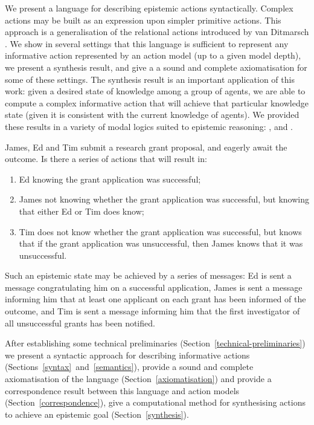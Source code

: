 \documentclass[twoside]{aiml14}
\begin{document}
  We present a language for describing epistemic actions syntactically.
  Complex actions may be built as an expression upon simpler primitive actions.
  This approach is a generalisation of the relational actions introduced by van
  Ditmarsch \cite{vanditmarsch2001}. We show in several settings that this
  language is sufficient to represent any informative action represented by an
  action model (up to a given model depth), we present a synthesis result,
  and give a a sound and complete axiomatisation for some of these settings. 
  The synthesis result is an important application of this work: given a
  desired state of knowledge among a group of agents, we are able to compute a
  complex informative action that will achieve that particular knowledge state
  (given it is consistent with the current knowledge of agents). We provided
  these results in a variety of modal logics suited to epistemic reasoning:
  \classK{}, \classKFF{} and \classS{}.
  
  \begin{example}\label{grant-example}
  James, Ed and Tim submit a research grant proposal, and eagerly await the
  outcome. Is there a series of actions that will result in: 

  \begin{enumerate}
    \item Ed knowing the grant application was successful; 
    \item James not knowing whether the grant application was successful, but knowing that
        either Ed or Tim does know;
    \item Tim does not know whether the grant application was successful, but knows that if
        the grant application was unsuccessful, then James knows that it was unsuccessful.
  \end{enumerate}

  Such an epistemic state may be achieved by a series of messages: Ed is sent a
  message congratulating him on a successful application, James is sent a
  message informing him that at least one applicant on each grant has been
  informed of the outcome, and Tim is sent a message informing him that the
  first investigator of all unsuccessful grants has been notified.
  \end{example}
  
  After establishing some technical preliminaries (Section~\ref{technical-preliminaries}) we
  present a syntactic approach for describing informative actions (Sections~\ref{syntax}~and~\ref{semantics}), 
  provide a sound and complete axiomatisation of the language (Section~\ref{axiomatisation}) and
  provide a correspondence result between this language and action models (Section~\ref{correspondence}),
  give a computational method for synthesising actions to achieve an epistemic goal (Section~\ref{synthesis}).
\end{document}
